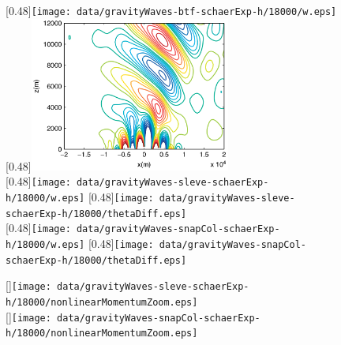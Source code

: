 \begin{figure}
	\captionsetup[subfigure]{position=b}
	\centering
	[0.48\textwidth]{\texttt{[image: data/gravityWaves-btf-schaerExp-h/18000/w.eps]}}
	\hfill
	[0.48\textwidth]{\includegraphics[height=2in]{img/melvin-7a.png}} \\
	[0.48\textwidth]{\texttt{[image: data/gravityWaves-sleve-schaerExp-h/18000/w.eps]}}
	\hfill
	[0.48\textwidth]{\texttt{[image: data/gravityWaves-sleve-schaerExp-h/18000/thetaDiff.eps]}} \\
	[0.48\textwidth]{\texttt{[image: data/gravityWaves-snapCol-schaerExp-h/18000/w.eps]}}
	\hfill
	[0.48\textwidth]{\texttt{[image: data/gravityWaves-snapCol-schaerExp-h/18000/thetaDiff.eps]} }
	\caption{}
	\label{fig:gw:w}
\end{figure}

\begin{figure}
	\captionsetup[subfigure]{position=b}
	\centering
	[\textwidth]{\texttt{[image: data/gravityWaves-sleve-schaerExp-h/18000/nonlinearMomentumZoom.eps]}} \\
	[\textwidth]{\texttt{[image: data/gravityWaves-snapCol-schaerExp-h/18000/nonlinearMomentumZoom.eps]}}
	\caption{}
	\label{fig:gw:thetaDiffZoom}
\end{figure}

